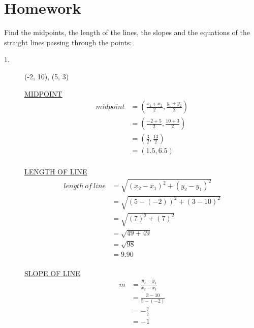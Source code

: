\documentclass{article}
\begin{document}
\section*{\centering Homework}
\begin{Large} Find the midpoints, the length of the lines, the slopes and the equations of the straight lines passing through the points:\end{Large}
\begin{description}
    \item[1.]  \begin{Large} (-2, 10), (5, 3)\end{Large}

        \underline{MIDPOINT}
        $$
            \begin{aligned}
                midpoint & = (\frac{x_1+x_2}{2}, \frac{y_1+y_2}{2}) \\
                         & = (\frac{-2+5}{2}, \frac{10+3}{2})       \\
                         & = (\frac{3}{2}, \frac{13}{2})            \\
                         & = (1.5, 6.5)                             \\
            \end{aligned}
        $$

        \underline{LENGTH OF LINE}
        $$
            \begin{aligned}
                length \ of \ line & = \sqrt{(x_2-x_1)^2 + (y_2-y_1)^2} \\
                                   & = \sqrt{(5-(-2))^2 + (3-10)^2}     \\
                                   & = \sqrt{(7)^2 + (7)^2}             \\
                                   & = \sqrt{49 + 49}                   \\
                                   & = \sqrt{98}                        \\
                                   & = 9.90                             \\
            \end{aligned}
        $$

        \underline{SLOPE OF LINE}
        $$
            \begin{aligned}
                m & = \frac{y_2-y_1}{x_2-x_1} \\
                  & = \frac{3-10}{5-(-2)}     \\
                  & = -\frac{7}{7}            \\
                  & = -1                      \\
            \end{aligned}
        $$


\end{description}
\end{document}
